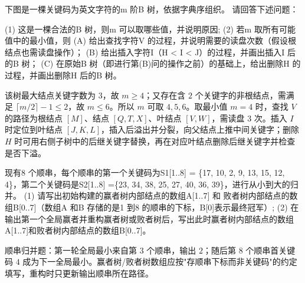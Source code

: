 \begin{question}[4 分]
下图是一棵关键码为英文字符的m 阶B 树，依据字典序组织。 请回答下述问题：

\begin{center}
\end{center}
(1) 这是一棵合法的B 树，则m 可以取哪些值，并说明原因;
(2) 若m 取所有可能值中的最小值，则
(A) 给出查找字符V 的过程，并说明需要的读盘次数（假设根结点也需读盘操作）；
(B) 给出插入字符I（H < I < J）的过程，并画出插入I 后的B 树；
(C) 在原始B 树（即进行第(B)问的操作之前）的基础上，给出删除H 的过程，并画出删除H 后的B 树。

\begin{solution}
该树最大结点关键字数为 $3$，故 $m\ge4$；又存在含 $2$ 个关键字的非根结点，需满足 $\lceil m/2\rceil-1\le2$，故 $m\le6$。所以 $m$ 可取 $4,5,6$。取最小值 $m=4$ 时，查找 $V$ 的路径为根结点 $[M]$、结点 $[Q,T,X]$、叶结点 $[V,W]$，需读盘 $3$ 次。插入 $I$ 时定位到叶结点 $[J,K,L]$，插入后溢出并分裂，向父结点上推中间关键字；删除 $H$ 时可用右侧子树中的后继关键字替换，再在对应叶结点删除后继关键字并检查是否下溢。
\end{solution}
\end{question}

\begin{question}[4 分]
现有8 个顺串，每个顺串的第一个关键码为S1[1..8] = \{17, 10, 2, 9, 13, 15, 12, 4\}，第二个关键码是S2[1..8] =\{23, 34, 38, 25, 27, 40, 36, 39\}，进行从小到大的归并。
(1) 请写出初始构建的赢者树内部结点的数组A[1..7] 和 败者树内部结点的数组B[0..7]（数组A 和B 存储的是1 到8 的顺串的下标，B[0]表示最终冠军）;
(2) 在输出第一个全局赢者并重构赢者树或败者树后，写出此时赢者树内部结点的数组A[1..7]和败者树内部结点的数组B[0..7]。

\begin{solution}
顺串归并题：第一轮全局最小来自第 3 个顺串，输出 $2$；随后第 8 个顺串首关键码 $4$ 成为下一全局最小。赢者树/败者树数组应按"存顺串下标而非关键码"的约定填写，重构时只更新输出顺串所在路径。
\end{solution}
\end{question}

